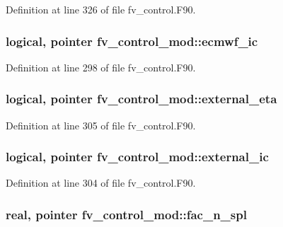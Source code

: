 Definition at line 326 of file fv\-\_\-control.\-F90.

\subsubsection[{ecmwf\-\_\-ic}]{\setlength{\rightskip}{0pt plus 5cm}logical, pointer fv\-\_\-control\-\_\-mod\-::ecmwf\-\_\-ic\hspace{0.3cm}{\ttfamily [private]}}\label{classfv__control__mod_a2c5506c3c86aaa2ea7ee7e7db98f6f03}


Definition at line 298 of file fv\-\_\-control.\-F90.

\subsubsection[{external\-\_\-eta}]{\setlength{\rightskip}{0pt plus 5cm}logical, pointer fv\-\_\-control\-\_\-mod\-::external\-\_\-eta\hspace{0.3cm}{\ttfamily [private]}}\label{classfv__control__mod_a0457568f23f81b319e4000137cb85cd2}


Definition at line 305 of file fv\-\_\-control.\-F90.

\subsubsection[{external\-\_\-ic}]{\setlength{\rightskip}{0pt plus 5cm}logical, pointer fv\-\_\-control\-\_\-mod\-::external\-\_\-ic\hspace{0.3cm}{\ttfamily [private]}}\label{classfv__control__mod_a98a28143f20b09d0d461a3378cce066c}


Definition at line 304 of file fv\-\_\-control.\-F90.

\subsubsection[{fac\-\_\-n\-\_\-spl}]{\setlength{\rightskip}{0pt plus 5cm}real, pointer fv\-\_\-control\-\_\-mod\-::fac\-\_\-n\-\_\-spl\hspace{0.3cm}{\ttfamily [private]}}\label{classfv__control__mod_afc7f6b4f409eaa570ca132fad25816b7}


